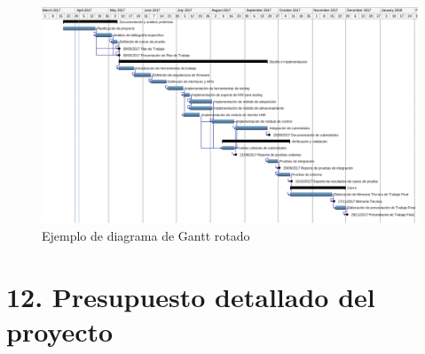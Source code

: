 \documentclass[
11pt, %
]{charter}
\begin{document}
\begin{landscape}
\begin{figure}[htpb]
\centering 
\includegraphics[height=.85\textheight]{./Figuras/Gantt-2.png}
\caption{Ejemplo de diagrama de Gantt rotado}
\label{fig:diagGantt}
\end{figure}

\end{landscape}


\section{12. Presupuesto detallado del proyecto}
\label{sec:presupuesto}
\end{document}
